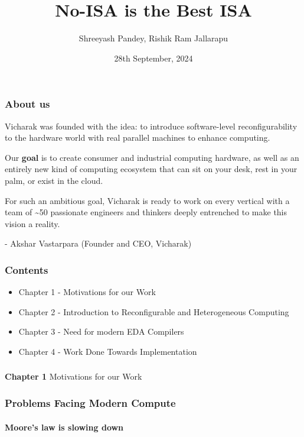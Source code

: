 \documentclass{beamer}
\title{No-ISA is the Best ISA}
\subtitle{}
\author{Shreeyash Pandey, Rishik Ram Jallarapu}
\institute{Vicharak, India @ vicharak.in}
\date{28th September, 2024}
\begin{document}
\begin{frame}
\titlepage
\end{frame}

{

\begin{frame}[fragile]
\frametitle{About us}

  Vicharak was founded with the idea: to introduce software-level
  reconfigurability to the hardware world with real parallel machines to enhance
  computing. 

  Our \textbf{goal} is to create consumer and industrial
  computing hardware, as well as an entirely new kind of computing ecosystem
  that can sit on your desk, rest in your palm, or exist in the cloud. 

  For such an ambitious goal, Vicharak is ready to work on every vertical with
  a team of \~{}50 passionate engineers and thinkers deeply entrenched to make this
  vision a reality.

  - Akshar Vastarpara (Founder and CEO, Vicharak)

\framesubtitle{}
\end{frame}

\begin{frame}[fragile]
\frametitle{Contents}

  \begin{itemize}
    \item Chapter 1 - Motivations for our Work
    \item Chapter 2 - Introduction to Reconfigurable and Heterogeneous Computing
    \item Chapter 3 - Need for modern EDA Compilers
    \item Chapter 4 - Work Done Towards Implementation  
  \end{itemize}
\end{frame}

\begin{frame}[c,fragile]
  \frametitle{}
  \centering
  \textbf{Chapter 1}
  \centering
  Motivations for our Work
\end{frame}

\begin{frame}[fragile]
\frametitle{Problems Facing Modern Compute}
\framesubtitle{Moore's law is slowing down}


\end{frame}}
\end{document}
